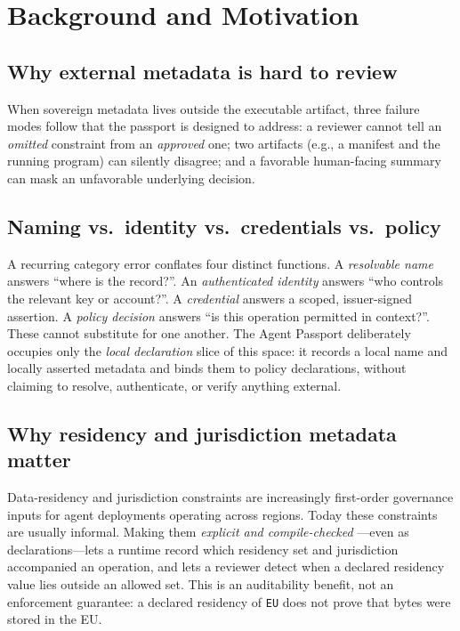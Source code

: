 \documentclass[conference]{IEEEtran}
\newcommand{\code}[1]{\texttt{\small #1}}
\begin{document}
\section{Background and Motivation}\label{sec:background}

\subsection{Why external metadata is hard to review}
When sovereign metadata lives outside the executable artifact, three failure
modes follow that the passport is designed to address: a reviewer cannot tell an
\emph{omitted} constraint from an \emph{approved} one; two artifacts (e.g., a
manifest and the running program) can silently disagree; and a favorable
human-facing summary can mask an unfavorable underlying decision.

\subsection{Naming vs.\ identity vs.\ credentials vs.\ policy}
A recurring category error conflates four distinct functions. A \emph{resolvable
name} answers ``where is the record?''. An \emph{authenticated identity} answers
``who controls the relevant key or account?''. A \emph{credential} answers a
scoped, issuer-signed assertion. A \emph{policy decision} answers ``is this
operation permitted in context?''. These cannot substitute for one another. The
Agent Passport deliberately occupies only the \emph{local declaration} slice of
this space: it records a local name and locally asserted metadata and binds them
to policy declarations, without claiming to resolve, authenticate, or verify
anything external.

\subsection{Why residency and jurisdiction metadata matter}
Data-residency and jurisdiction constraints are increasingly first-order
governance inputs for agent deployments operating across regions. Today these
constraints are usually informal. Making them \emph{explicit and compile-checked}
---even as declarations---lets a runtime record which residency set and
jurisdiction accompanied an operation, and lets a reviewer detect when a declared
residency value lies outside an allowed set. This is an auditability benefit, not
an enforcement guarantee: a declared residency of \code{EU} does not prove that
bytes were stored in the EU.
\end{document}
